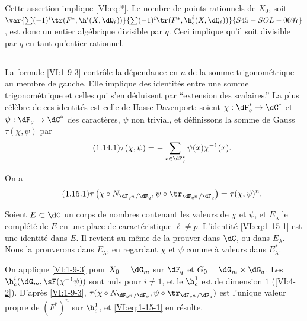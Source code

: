 Cette assertion implique \eqref{VI:eq:*}. Le nombre de points rationnels de 
$X_0$, soit $\var{\sum (-1)^i \tr(F^\ast,\h^i(X,\dQ_\ell))}{\sum (-1)^i \tr(F^\ast,\h_c^i(X,\dQ_\ell))}{S45-SOL-0697}$, est donc un entier 
algébrique divisible par $q$. Ceci implique qu'il soit divisible par $q$ en 
tant qu'entier rationnel. 





\subsection{}\label{VI:1-14}

La formule \ref{VI:1-9-3} contrôle la dépendance en $n$ de la somme 
trigonométrique au membre de gauche. Elle implique des identités entre une 
somme trigonométrique et celles qui s'en déduisent par ``extension des 
scalaires.'' La plus célèbre de ces identités est celle de 
Hasse-Davenport: soient $\chi:\dF_q^\ast \to \dC^\ast$ et 
$\psi:\dF_q\to \dC^\ast$ des caractères, $\psi$ non trivial, et 
définissons la somme de Gauss $\tau(\chi,\psi)$ par 
\begin{equation*}\tag{1.14.1}\label{VI:eq:1-14-1}
  \tau(\chi,\psi) = - \sum_{x\in \dF_q^\ast} \psi(x) \chi^{-1}(x) \text{.}
\end{equation*}





\begin{theorem_}\label{VI:1-15}
On a 
\begin{equation*}\tag{1.15.1}\label{VI:eq:1-15-1}
  \tau\left(\chi\circ N_{\dF_{q^n}/\dF_q},\psi\circ \tr_{\dF_{q^n}/\dF_q}\right) = \tau(\chi,\psi)^n \text{.}
\end{equation*}
\end{theorem_}

Soient $E\subset \dC$ un corps de nombres contenant les valeurs de $\chi$ et 
$\psi$, et $E_\lambda$ le complété de $E$ en une place de caractéristique 
$\ell\ne p$. L'identité \eqref{VI:eq:1-15-1} est une identité dans $E$. Il 
revient au même de la prouver dans $\dC$, ou dans $E_\lambda$. Nous la 
prouverons dans $E_\lambda$, en regardant $\chi$ et $\psi$ comme à valeurs 
dans $E_\lambda^\ast$. 

On applique \ref{VI:1-9-3} pour $X_0=\dG_m$ sur $\dF_q$ et 
$G_0=\dG_m\times \dG_a$. Les $\h_c^i(\dG_m,\sF(\chi^{-1}\psi))$ sont nuls pour 
$i\ne 1$, et le $\h_c^1$ est de dimension $1$ (\ref{VI:4-2}). D'après 
\ref{VI:1-9-3}, 
$\tau(\chi\circ N_{\dF_{q^n}/\dF_q},\psi\circ \tr_{\dF_{q^n}/\dF_q})$ est 
l'unique valeur propre de $(F^\ast)^n$ sur $\h_c^1$, et \eqref{VI:eq:1-15-1} en 
résulte. 

